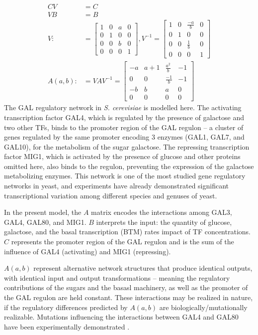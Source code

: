 \documentclass{article}
\newcommand{\1}{\mathbbm{1}}
\begin{document}
    \begin{align*}
      CV &= C \\
      VB &= B \\
      V :&= \begin{bmatrix} 1 & 0 & a & 0 \\ 0 & 1 & 0 & 0 \\ 0 & 0 & b & 0 \\ 0 & 0 & 0 & 1 \end{bmatrix} , V^{-1} = \begin{bmatrix} 1 & 0 & \frac{-a}{b} & 0 \\ 0 & 1 & 0 & 0 \\ 0 & 0 & \frac{1}{b} & 0 \\ 0 & 0 & 0 & 1\end{bmatrix} \\
        A(a,b) :&= VAV^{-1} = \begin{bmatrix} -a & a+1 & \frac{a^{2}}{b} & -1 \\ 0 & 0 & \frac{-1}{b} & -1 \\ -b & b & a & 0 \\ 0 & 0 & 0 & 0 \end{bmatrix}
    \end{align*}
    The GAL regulatory network in \emph{S. cerevisiae} is modelled here. The activating transcription factor GAL4, which is regulated by the presence of galactose and two other TFs, binds to the promoter region of the GAL regulon -- a cluster of genes regulated by the same promoter encoding 3 enzymes (GAL1, GAL7, and GAL10), for the metabolism of the sugar galactose. The repressing transcription factor MIG1, which is activated by the presence of glucose and other proteins omitted here, also binds to the regulon, preventing the expression of the galactose metabolizing enzymes. This network is one of the most studied gene regulatory networks in yeast, and experiments have already demonstrated significant transcriptional variation among different species and genuses of yeast.

    In the present model, the $A$ matrix encodes the interactions among GAL3, GAL4, GAL80, and MIG1. $B$ interprets the input: the quantity of glucose, galactose, and the basal transcription (BTM) rates impact of TF concentrations. $C$ represents the promoter region of the GAL regulon and is the sum of the influence of GAL4 (activating) and MIG1 (repressing).

    $A(a,b)$ represent alternative network structures that produce identical outputs, with identical input and output transformations -- meaning the regulatory contributions of the sugars and the basasl machinery, as well as the promoter of the GAL regulon are held constant. These interactions may be realized in nature, if the regulatory differences predicted by $A(a,b)$ are biologically/mutationally realizable. Mutations influencing the interactions between GAL4 and GAL80 have been experimentally demonstrated \citep{li2010alterations}.
\end{document}
